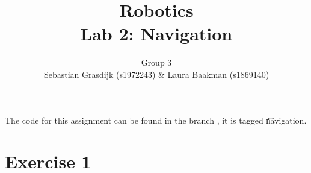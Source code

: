 \documentclass[a4paper]{article}
\title{Robotics\\ Lab 2: Navigation}
\author{Group 3\\Sebastian Grasdijk (s1972243) \& Laura Baakman (s1869140)}
\begin{document}
\maketitle

\noindent The code for this assignment can be found in the branch , it is tagged \t{navigation}.

\section*{Exercise 1}


% 

% 

\printbibliography

\clearpage
\appendix

\end{document}
